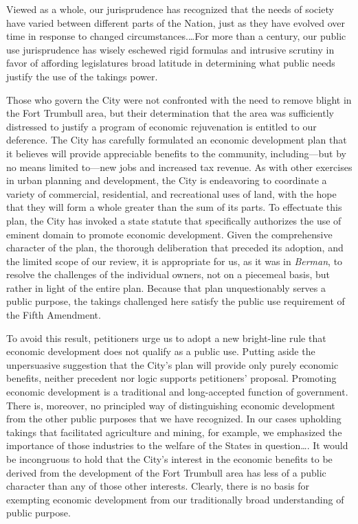 Viewed as a whole, our jurisprudence has recognized that the needs of society
have varied between different parts of the Nation, just as they have evolved
over time in response to changed circumstances.\ldots For more than a century,
our public use jurisprudence has wisely eschewed rigid formulas and intrusive
scrutiny in favor of affording legislatures broad latitude in determining what
public needs justify the use of the takings power.



Those who govern the City were not confronted with the need to remove blight in
the Fort Trumbull area, but their determination that the area was sufficiently
distressed to justify a program of economic rejuvenation is entitled to our
deference. The City has carefully formulated an economic development plan that
it believes will provide appreciable benefits to the community, including---but
by no means limited to---new jobs and increased tax revenue. As with other
exercises in urban planning and development, the City is endeavoring to
coordinate a variety of commercial, residential, and recreational uses of land,
with the hope that they will form a whole greater than the sum of its parts. To
effectuate this plan, the City has invoked a state statute that specifically
authorizes the use of eminent domain to promote economic development. Given the
comprehensive character of the plan, the thorough deliberation that preceded its
adoption, and the limited scope of our review, it is appropriate for us, as it
was in \textit{Berman}, to resolve the challenges of the individual owners, not
on a piecemeal basis, but rather in light of the entire plan. Because that plan
unquestionably serves a public purpose, the takings challenged here satisfy the
public use requirement of the Fifth Amendment.

To avoid this result, petitioners urge us to adopt a new bright-line rule that
economic development does not qualify as a public use. Putting aside the
unpersuasive suggestion that the City's plan will provide only purely economic
benefits, neither precedent nor logic supports petitioners' proposal. Promoting
economic development is a traditional and long-accepted function of government.
There is, moreover, no principled way of distinguishing economic development
from the other public purposes that we have recognized. In our cases upholding
takings that facilitated agriculture and mining, for example, we emphasized the
importance of those industries to the welfare of the States in question\ldots .
It would be incongruous to hold that the City's interest in the economic
benefits to be derived from the development of the Fort Trumbull area has less
of a public character than any of those other interests. Clearly, there is no
basis for exempting economic development from our traditionally broad
understanding of public purpose.


